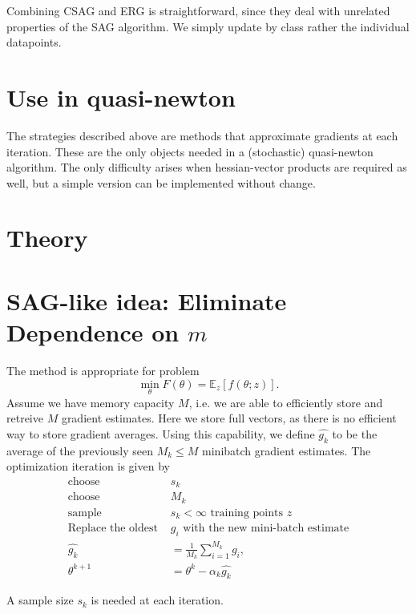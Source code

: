 \documentclass[12pt]{article}
\begin{document}
	Combining CSAG and ERG is straightforward, since they deal with unrelated properties of the SAG algorithm. We simply update by class rather the individual datapoints. 
	
		
	\section{Use in quasi-newton}
	The strategies described above are methods that approximate gradients at each iteration. These are the only objects needed in a (stochastic) quasi-newton algorithm. The only difficulty arises when hessian-vector products are required as well, but a simple version can be implemented without change. 
		
	\section{Theory}
	
	\newpage 
	
	\section{SAG-like idea: Eliminate Dependence on $m$}
	 The method is appropriate for problem 
	\begin{equation}
		\min_{\theta} F(\theta) = \mathbb{E}_{z}[ f(\theta;z)].
	\end{equation}
	Assume we have memory capacity $M$, i.e. we are able to efficiently store and retreive $M$ gradient estimates. Here we store full vectors, as there is no efficient way to store gradient averages. Using this capability, we define $\hat{g_k}$ to be the average of the previously seen $M_k \leq M$ minibatch gradient estimates. The optimization iteration is given by	
	 \begin{align}
	   \mbox{choose } & s_k \\
	   \mbox{choose } & M_k \\
	   \mbox{sample } &s_k < \infty \mbox{ training points } z \\
	   \mbox{Replace the oldest }  &g_i \mbox{ with the new mini-batch estimate}\\
	   \hat{g_k} &= \frac{1}{M_k} \sum_{i=1}^{M_k} g_i, \\
	   \theta^{k+1} &= \theta^k - \alpha_k \hat{g_k}
	\end{align}
	
	A sample size $s_k$ is needed at each iteration.
	
	
\end{document}
